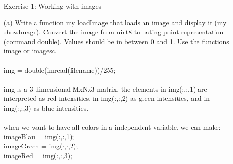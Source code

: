 





 
    \begin{enumerate}
         \item[Exercise 1:] Working with images
    \end{enumerate}
    \begin{enumerate}
        \item[(a)] Write a function my loadImage that loads an image and display it (my showImage). Convert the image from uint8 to oating point representation (command double). Values should be in between 0 and 1. Use the functions image or imagesc.
        \\
        \\ img = double(imread(filename))/255; \\
        \\ img is a 3-dimensional MxNx3 matrix, the elements in img(:,:,1) are interpreted as red intensities, in img(:,:,2) as green intensities, and in img(:,:,3) as blue intensities.
        \\ 
        \\  when we want to have all colors in a independent variable, we can make:
        \\  imageBlau  = img(:,:,1);
        \\  imageGreen = img(:,:,2);
        \\  imageRed   = img(:,:,3);
    \end{enumerate}
